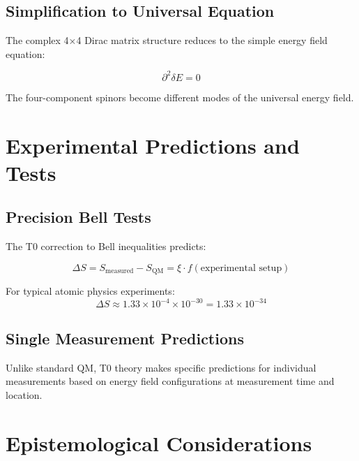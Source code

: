 \documentclass[12pt,a4paper]{report}
\begin{document}
	\subsection{Simplification to Universal Equation}
	\label{subsec:dirac_simplification}
	
	The complex 4×4 Dirac matrix structure reduces to the simple energy field equation:
	
	\begin{equation}
		\partial^2 \delta E = 0
	\end{equation}
	
	The four-component spinors become different modes of the universal energy field.
	
	\section{Experimental Predictions and Tests}
	\label{sec:experimental_predictions}
	
	\subsection{Precision Bell Tests}
	\label{subsec:precision_bell_tests}
	
	The T0 correction to Bell inequalities predicts:
	
	\begin{equation}
		\Delta S = S_{\text{measured}} - S_{\text{QM}} = \xi \cdot f(\text{experimental setup})
	\end{equation}
	
	For typical atomic physics experiments:
	\begin{equation}
		\Delta S \approx 1.33 \times 10^{-4} \times 10^{-30} = 1.33 \times 10^{-34}
	\end{equation}
	
	\subsection{Single Measurement Predictions}
	\label{subsec:single_measurement_predictions}
	
	Unlike standard QM, T0 theory makes specific predictions for individual measurements based on energy field configurations at measurement time and location.
	
	\section{Epistemological Considerations}
	\label{sec:epistemological}
	
\end{document}
